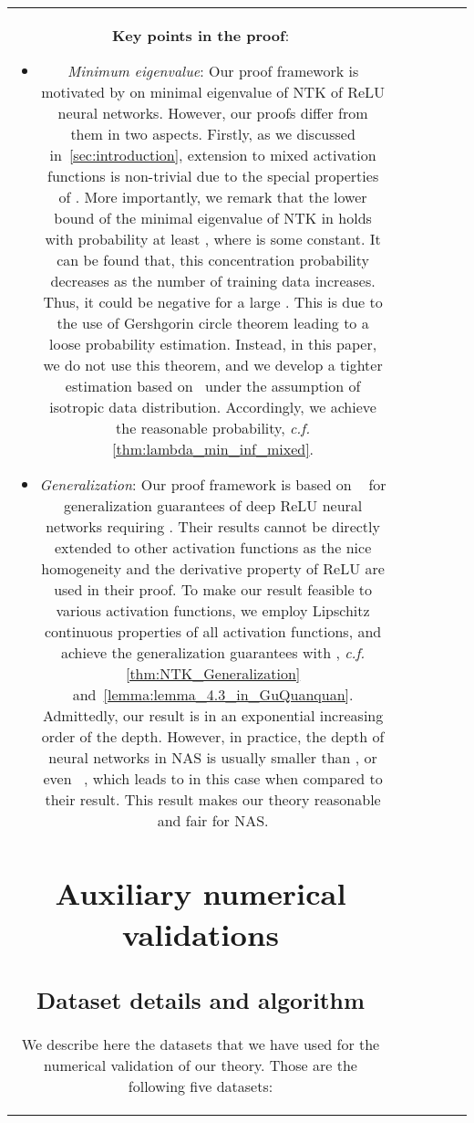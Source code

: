 \documentclass[nohyperref]{article}
\theoremstyle{plain}
\theoremstyle{definition}
\theoremstyle{remark}
\begin{document}
\begin{table*}[t]
\begin{threeparttable}
{\begin{tabular}{c|c|c|c|c|c}
    
\textbf{Key points in the proof}:
\begin{itemize}
    \item \emph{Minimum eigenvalue}: Our proof framework is motivated by \citet{pmlr-v139-nguyen21g} on minimal eigenvalue of NTK of ReLU neural networks. However, our proofs differ from them in two aspects. Firstly, as we discussed in~\cref{sec:introduction}, extension to mixed activation functions is non-trivial due to the special properties of . More importantly, we remark that the lower bound of the minimal eigenvalue of NTK in \citep[Theorem 3.2]{pmlr-v139-nguyen21g} holds with probability at least , where  is some constant.
    It can be found that, this concentration probability decreases as the number of training data increases. Thus, it could be negative for a large .
    This is due to the use of Gershgorin circle theorem leading to a loose probability estimation. Instead, in this paper, we do not use this theorem, and we develop a tighter estimation based on~\citet{10.1214/ECP.v19-3807} under the assumption of isotropic data distribution. Accordingly, we achieve the reasonable  probability, \emph{c.f.} \cref{thm:lambda_min_inf_mixed}.
    \item \emph{Generalization}: Our proof framework is based on ~\citet{cao2019generalization} for generalization guarantees of deep ReLU neural networks requiring . Their results cannot be directly extended to other activation functions as the nice homogeneity and the derivative property of ReLU are used in their proof.
    To make our result feasible to various activation functions, we employ Lipschitz continuous properties of all activation functions, and achieve the generalization guarantees with , \emph{c.f.} \cref{thm:NTK_Generalization} and~\cref{lemma:lemma_4.3_in_GuQuanquan}.
    Admittedly, our result is in an exponential increasing order of the depth. However, in practice, the depth of neural networks in NAS is usually smaller than , or even ~\citep{liu2018hierarchical, dong2021nats}, which leads to  in this case when compared to their result.
    This result makes our theory reasonable and fair for NAS.
\end{itemize}

\section{Auxiliary numerical validations}
\label{sec:additional_experiments}

\subsection{Dataset details and algorithm}
\label{ssec:dataset}
We describe here the datasets that we have used for the numerical validation of our theory. Those are the following five datasets:


\end{tabular}}
\end{threeparttable}
\end{table*}
\end{document}
